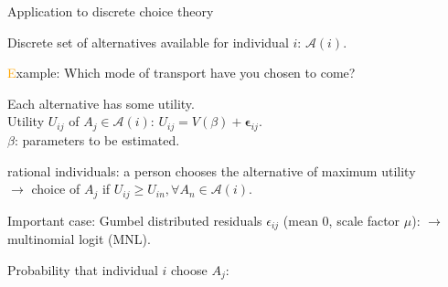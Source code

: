 \documentclass{beamer}
\begin{document}
\begin{frame}{Application to discrete choice theory}
		
			Discrete {\blue set of alternatives} available for individual $i$:
			$\mathcal{A}(i)$.
			
			\textcolor{orange}Example: Which mode of transport have you chosen to come?
			
			\vspace*{0.3cm}
			
			\begin{minipage}[c]{0.3\linewidth}
				\begin{center}
				\end{center}%
			\end{minipage}
			\begin{minipage}{0.68\linewidth}
				
				Each alternative has some utility.\\
				{\red Utility $U_{ij}$} of $A_j \in \mathcal{A}(i)$:
				$U_{i j} = V(\beta) + \boldsymbol{\epsilon}_{ij}.$\\
				$\beta$: parameters to be estimated.
				
				{\red rational individuals}: a person chooses
				the alternative of {\blue maximum utility}\\
				{\red $\rightarrow$} choice of $A_j$ if $U_{ij} \geq U_{in}, \forall A_n \in
				\mathcal{A}(i)$.
				
			\end{minipage}
			
				Important case: Gumbel distributed residuals $\epsilon_{ij}$ (mean 0,
				scale factor $\mu$):
				{\red $\rightarrow$ multinomial logit} (MNL).
				
				{\blue Probability} that individual $i$ choose $A_j$:
		
\end{frame}

\end{document}
